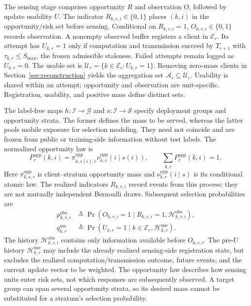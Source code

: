 \documentclass[letterpaper,journal]{IEEEtran}
\begin{document}
The sensing stage comprises opportunity $R$ and observation $O$, followed by
update usability $U$.  The indicator $R_{k,r,i}\in\{0,1\}$ places $(k,i)$ in
the opportunity/risk set before sensing.  Conditional on $R_{k,r,i}=1$,
$O_{k,r,i}\in\{0,1\}$ records observation.  A nonempty observed buffer
registers a client in $\mathcal E_r$.  Its attempt has $U_{k,r}=1$ only if
computation and transmission succeed by $T_{r+1}$ with
$\tau_{k,r}\le S_{\max}$, the frozen admissible staleness.  Failed attempts
remain logged as $U_{k,r}=0$.  The usable set is
$\mathcal U_r=\{k\in\mathcal E_r:U_{k,r}=1\}$.  Removing zero-mass clients in
Section~\ref{sec:reconstruction} yields the aggregation set
$\mathcal A_r\subseteq\mathcal U_r$.
Usability is shared within an attempt; opportunity and observation are
unit-specific. Registration, usability, and positive mass define distinct sets.

The label-free maps $h:\mathcal I\to\mathcal G$ and
$s:\mathcal I\to\mathcal S$ specify deployment groups and opportunity strata.
The former defines the mass to be served, whereas the latter pools mobile exposure for
selection modeling.  They need not coincide and are frozen from public or
training-side information without test labels.  The normalized opportunity law is
\begin{equation}
 P_r^{\mathrm{opp}}(k,i)
 =
 \pi^{\mathrm{opp}}_{k,s(i),r}
 \nu^{\mathrm{opp}}_{k,r}(i\mid s(i)),
 \qquad
 \sum_{k,i}P_r^{\mathrm{opp}}(k,i)=1,
 \label{eq:opp_event_law}
\end{equation}
Here $\pi^{\mathrm{opp}}_{k,s,r}$ is client--stratum opportunity mass and
$\nu^{\mathrm{opp}}_{k,r}(i\mid s)$ is its conditional atomic law.  The
realized indicators $R_{k,r,i}$ record events from this process; they are not
mutually independent Bernoulli draws.  Subsequent selection probabilities are
\begin{align}
 p^{\mathrm{obs}}_{k,r,i}
 &\triangleq
 \Pr\!\left(
 O_{k,r,i}=1
 \mid
 R_{k,r,i}=1,\mathcal{H}^{\mathrm{obs}}_{k,r,i}
 \right),
 \label{eq:pobs_def}\\
 q^{\mathrm{use}}_{k,r}
 &\triangleq
 \Pr\!\left(
 U_{k,r}=1
 \mid
 k\in\mathcal{E}_r,\mathcal{H}^{\mathrm{use}}_{k,r}
 \right).
 \label{eq:quse_def}
\end{align}
The history $\mathcal H^{\mathrm{obs}}_{k,r,i}$ contains only information
available before $O_{k,r,i}$.  The pre-$U$ history
$\mathcal H^{\mathrm{use}}_{k,r}$ may include the already realized sensing-side
registration state, but excludes the realized computation/transmission outcome,
future events, and the current update vector to be weighted.  The opportunity law describes how sensing units enter risk sets, not which
responses are subsequently observed.  A target group can span several
opportunity strata, so its desired mass cannot be substituted for a stratum's
selection probability.
\end{document}

